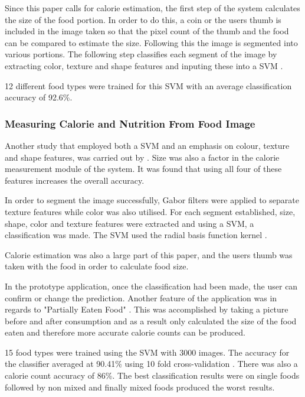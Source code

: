 Since this paper calls for calorie estimation, the first step of the system calculates the size of the food portion. In order to do this, a coin or the users thumb is included in the image taken so that the pixel count of the thumb and the food can be compared to estimate the size. Following this the image is segmented into various portions. The following step classifies each segment of the image by extracting color, texture and shape features and inputing these into a SVM \parencite{novelSVM}.

12 different food types were trained for this SVM with an average classification accuracy of 92.6\%.

\subsubsection*{Measuring Calorie and Nutrition From Food Image}
Another study that employed both a SVM and an emphasis on colour, texture and shape features, was carried out by \parencite{pouladzadeh2014measuring}. Size was also a factor in the calorie measurement module of the system. It was found that using all four of these features increases the overall accuracy.

In order to segment the image successfully, Gabor filters were applied to separate texture features while color was also utilised. For each segment established, size, shape, color and texture features were extracted and using a SVM, a classification was made. The SVM used the radial basis function kernel \parencite{pouladzadeh2014measuring}.

Calorie estimation was also a large part of this paper, and the users thumb was taken with the food in order to calculate food size.

In the prototype application, once the classification had been made, the user can confirm or change the prediction. Another feature of the application was in regards to "Partially Eaten Food" \parencite{pouladzadeh2014measuring}. This was accomplished by taking a picture before and after consumption and as a result only calculated the size of the food eaten and therefore more accurate calorie counts can be produced.

15 food types were trained using the SVM with 3000 images. The accuracy for the classifier averaged at 90.41\% using 10 fold cross-validation \parencite{pouladzadeh2014measuring}. There was also a calorie count accuracy of 86\%. The best classification results were on single foods followed by non mixed and finally mixed foods produced the worst results.

